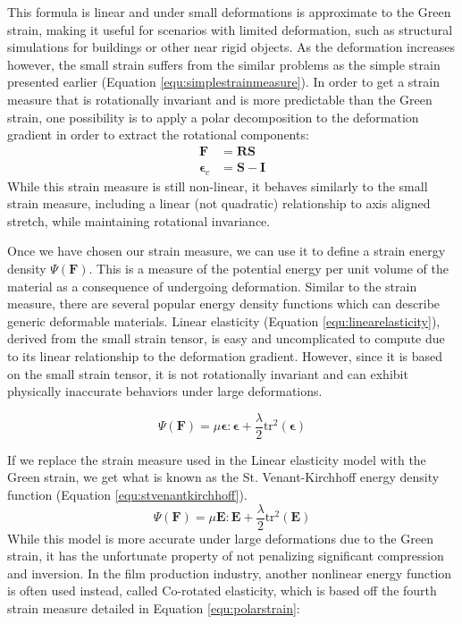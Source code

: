This formula is linear and under small deformations is approximate to
the Green strain, making it useful for scenarios with limited
deformation, such as structural simulations for buildings or other
near rigid objects. As the deformation increases however, the small
strain suffers from the similar problems as the simple strain
presented earlier (Equation \ref{equ:simplestrainmeasure}).  In order to get a strain measure that is
rotationally invariant and is more predictable than the Green strain,
one possibility is to apply a polar decomposition to the deformation
gradient in order to extract the rotational components:
\begin{equation}
  \label{equ:polarstrain}
  \begin{split}
    \mathbf F &= \mathbf R\mathbf S\\
    \bm \epsilon_c &= \mathbf S - \mathbf I
  \end{split}
\end{equation}
While this strain measure is still non-linear, it behaves similarly to
the small strain measure, including a linear (not quadratic)
relationship to axis aligned stretch, while maintaining rotational
invariance.

Once we have chosen our strain measure, we can use it to define a
strain energy density $\Psi(\mathbf{F})$. This is a measure of the
potential energy per unit volume of the material as a consequence of
undergoing deformation.  Similar to the strain measure, there are
several popular energy density functions which can describe generic
deformable materials. Linear elasticity (Equation
\ref{equ:linearelasticity}), derived from the small strain tensor, is
easy and uncomplicated to compute due to its linear relationship to
the deformation gradient. However, since it is based on the small
strain tensor, it is not rotationally invariant and can exhibit
physically inaccurate behaviors under large deformations.

\begin{equation}
  \label{equ:linearelasticity}
  \Psi(\mathbf{F}) = \mu \bm \epsilon : \bm \epsilon + \frac \lambda 2
  \text{tr}^2(\bm \epsilon)
\end{equation}

If we replace the strain measure used in the Linear
elasticity model with the Green strain, we get what is known as
the St. Venant-Kirchhoff energy density function (Equation
\ref{equ:stvenantkirchhoff}).
\begin{equation}
  \label{equ:stvenantkirchhoff}
  \Psi(\mathbf{F}) = \mu \mathbf{E} : \mathbf{E} + \frac \lambda 2
  \text{tr}^2(\mathbf E)
\end{equation}
While this model is more accurate under large deformations due to the
Green strain, it has the unfortunate property of not penalizing
significant compression and inversion. In the film production
industry, another nonlinear energy function is often used instead,
called Co-rotated elasticity, which is based off the fourth strain
measure detailed in Equation \ref{equ:polarstrain}:

